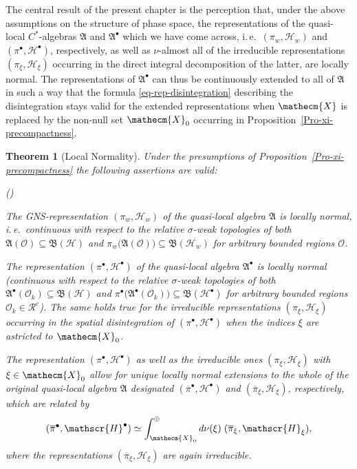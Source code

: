 \documentclass[11pt,twoside,openright]{report}
\theoremstyle{definition}
\theoremstyle{plain}
\newtheorem{The}[Def]{Theorem}
\theoremstyle{remark}
\theoremstyle{assumption}
\newcommand{\Xecm}{\mathecm{X}}
\newcommand{\Afrak}{\mathfrak{A}}
\newcommand{\Hscr}{\mathscr{H}}
\newcommand{\Oscr}{\mathscr{O}}
\newcommand{\pibar}{\overline{\pi}}
\newcommand{\BH}{\mathfrak{B} ( \mathscr{H} )}
\newcommand{\BHbullet}{\mathfrak{B} ( \mathscr{H}^\bullet )}
\newcommand{\BHw}{\mathfrak{B} ( \mathscr{H}_w )}
\newcommand{\AO}{\mathfrak{A} ( \mathscr{O} )}
\newcommand{\Rcount}{\mathscr{R}^c}
\newcommand{\Hbullet}{\mathscr{H}^\bullet}
\newcommand{\Abullet}{\mathfrak{A}^\bullet}
\newcommand{\AbulletOk}{\mathfrak{A}^\bullet ( \mathscr{O}_k )}
\newcounter{propitem}
\newenvironment{proplist}{\begin{list}{(\roman{propitem})}%
  {\usecounter{propitem} \setlength{\topsep}{0ex}%
   \setlength{\parsep}{0.2ex} \setlength{\itemsep}{0.4ex}%
   \setlength{\leftmargin}{0em} \setlength{\itemindent}{0.5em}%
   }}{\end{list}}
\begin{document}
The central result of the present chapter is the perception that,
under the above assumptions on the structure of phase space, the
representations of the quasi-local $C^*$-algebras $\Afrak$ and
$\Abullet$ which we have come across, i.\,e.~$( \pi_w , \Hscr_w )$ and
$( \pi^\bullet , \Hbullet )$, respectively, as well as $\nu$-almost
all of the irreducible representations $( \pi_\xi , \Hscr_\xi )$
occurring in the direct integral decomposition of the latter, are
locally normal. The representations of $\Abullet$ can thus be
continuously extended to all of $\Afrak$ in such a way that the
formula \eqref{eq-rep-disintegration} describing the disintegration
stays valid for the extended representations when $\Xecm$ is replaced
by the non-null set $\Xecm_0$ occurring in
Proposition~\ref{Pro-xi-precompactness}.
\begin{The}[Local Normality]
  \label{The-local-normality}
  Under the presumptions of Proposition~\ref{Pro-xi-precompactness}
  the following assertions are valid:
  \begin{proplist}
  \item The GNS-representation $( \pi_w , \Hscr_w )$ of the
    quasi-local algebra $\Afrak$ is locally normal, i.\,e.~continuous
    with respect to the relative $\sigma$-weak topologies of both $\AO
    \subseteq \BH$ and $\pi_w \bigl( \AO \bigr) \subseteq \BHw$ for
    arbitrary bounded regions $\Oscr$.
  \item The representation $( \pi^\bullet , \Hbullet )$ of the
    quasi-local algebra $\Abullet$ is locally normal (continuous with
    respect to the relative $\sigma$-weak topologies of both
    $\AbulletOk \subseteq \BH$ and $\pi^\bullet \bigl( \AbulletOk
    \bigr) \subseteq \BHbullet$ for arbitrary bounded regions $\Oscr_k
    \in \Rcount$). The same holds true for the irreducible
    representations $( \pi_\xi , \Hscr_\xi )$ occurring in the spatial
    disintegration of $( \pi^\bullet , \Hbullet )$ when the indices
    $\xi$ are astricted to $\Xecm_0$.
  \item The representation $( \pi^\bullet , \Hbullet )$ as well as the
    irreducible ones $( \pi_\xi , \Hscr_\xi )$ with $\xi \in \Xecm_0$
    allow for unique locally normal extensions to the whole of the
    original quasi-local algebra $\Afrak$ designated $( \pibar^\bullet
    , \Hbullet )$ and $( \pibar_\xi , \Hscr_\xi )$, respectively,
    which are related by
    \begin{equation}
      \label{eq-rep-ext-disintegration}
      ( \pibar^\bullet , \Hbullet ) \simeq \int_{\Xecm_0}^\oplus d \nu
      ( \xi ) \; ( \pibar_\xi , \Hscr_\xi ) \text{,}
    \end{equation}
    where the representations $( \pibar_\xi , \Hscr_\xi )$ are again
    irreducible.
  \end{proplist}
\end{The}
\end{document}
